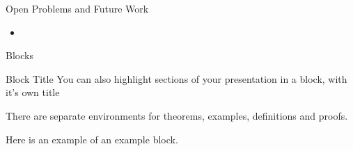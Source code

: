\documentclass{beamer}
\begin{document}
\begin{frame}{Open Problems and Future Work}
	\begin{itemize}
		\setlength\itemsep{1em}
		\item 
	\end{itemize}
\end{frame}

\begin{frame}{Blocks}
\begin{block}{Block Title}
You can also highlight sections of your presentation in a block, with it's own title
\end{block}
\begin{theorem}
There are separate environments for theorems, examples, definitions and proofs.
\end{theorem}
\begin{example}
Here is an example of an example block.
\end{example}
\end{frame}

%
%  
\end{document}
